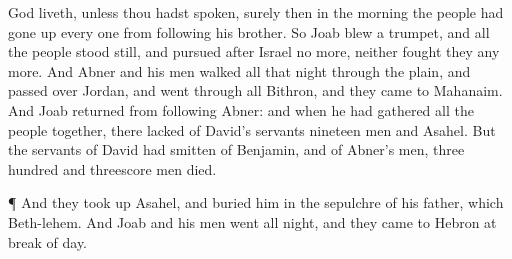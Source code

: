 {God
liveth,
unless thou hadst
spoken, surely then in the
morning the
people had gone
up every
one from
following his
brother.
So
Joab
blew a
trumpet, and all the
people stood
still, and
pursued
after
Israel no more, neither
fought they any
more.
And
Abner and his
men
walked all that
night through the
plain, and passed
over
Jordan, and went
through all
Bithron, and they
came to
Mahanaim.
And
Joab
returned from
following
Abner: and when he had
gathered all the
people
together, there
lacked of
David’s
servants
nineteen
men and
Asahel.
But the
servants of
David had
smitten of
Benjamin, and of
Abner’s
men,
{}
three
hundred and
threescore
men
died.
\par }{\PP {}¶ And they took
up
Asahel, and
buried him in the
sepulchre of his
father, which
{}
Beth-lehem. And
Joab and his
men
went all
night, and they came to
Hebron at break of
day.

}
